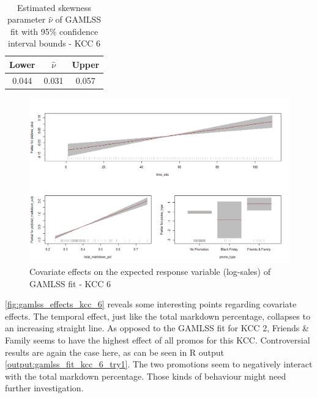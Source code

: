 \begin{table}[H]
\setlength\arrayrulewidth{1pt}  
\centering
\begin{adjustbox}{max width=\textwidth}\
\begin{tabular}{|c|c|c|}
\hline
\rowcolor{lightgray} 
Lower & $\hat{\nu}$ & Upper \\ \hline
0.044        & 0.031           & 0.057        \\ \hline
\end{tabular}
\end{adjustbox}
\caption{Estimated skewness parameter $\hat{\nu}$ of GAMLSS fit with 95\% confidence interval bounds - KCC 6}
\label{tab:nu_ci_kcc_6}
\end{table}







\begin{figure}[H]
\centering
  \includegraphics[width=0.95\linewidth]{figures/gamlss_effects_kcc_6.png}
  \caption{Covariate effects on the expected response variable (log-sales) of GAMLSS fit - KCC 6}
  \label{fig:gamlss_effects_kcc_6}
\end{figure}



\autoref{fig:gamlss_effects_kcc_6} reveals some interesting points regarding covariate effects. The temporal effect, just like the total markdown percentage, collapses to an increasing straight line. 
As opposed to the \ac{GAMLSS} fit for \ac{KCC} 2, Friends \& Family seems to have the highest effect of all promos for this \ac{KCC}. Controversial results are again the case here, as can be seen in R output \ref{output:gamlss_fit_kcc_6_try1}. The two promotions seem to negatively interact with the total markdown percentage. Those kinds of behaviour might need further investigation.
\\




